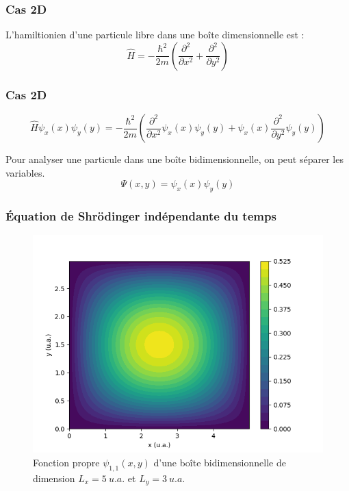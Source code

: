 \documentclass{beamer}
\begin{document}
\begin{frame}
\frametitle{Cas 2D}
L'hamiltionien d'une particule libre dans une boîte dimensionnelle est :
\begin{equation}
\hat{H}=-\frac{\hbar^2}{2m}\left(\frac{\partial^2}{\partial x^2}+\frac{\partial^2}{\partial y^2}\right)
\end{equation}

\end{frame}


\begin{frame}
\frametitle{Cas 2D}
\begin{equation}
\hat{H}\psi_x(x)\psi_y(y)=-\frac{\hbar^2}{2m}\left(\frac{\partial^2}{\partial x^2}\psi_x(x)\psi_y(y)+\psi_x(x)\frac{\partial^2}{\partial y^2}\psi_y(y)\right)
\end{equation}

Pour analyser une particule dans une boîte bidimensionnelle, on peut séparer les variables. 
\begin{equation}
\Psi(x,y)=\psi_x(x)\psi_y(y)
\end{equation}
\end{frame}




\begin{frame}
\frametitle{Équation de Shrödinger indépendante du temps}
\begin{figure}[h]
\includegraphics[scale=0.5]{fct_propre2d_11}
\caption{Fonction propre $\psi_{1,1}(x,y)$ d'une boîte bidimensionnelle de dimension $L_x=5\ u.a.$ et $L_y=3\ u.a.$}
\end{figure}
\end{frame}
\end{document}
